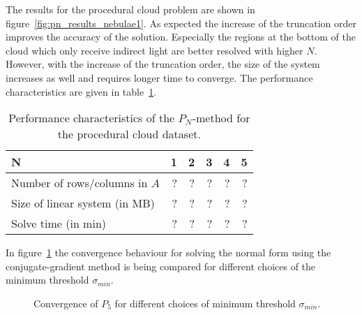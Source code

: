 The results for the procedural cloud problem are shown in figure~\ref{fig:pn_results_nebulae1}. As expected the increase of the truncation order improves the accuracy of the solution. Especially the regions at the bottom of the cloud which only receive indirect light are better resolved with higher $N$. However, with the increase of the truncation order, the size of the system increases as well and requires longer time to converge. The performance characteristics are given in table~\ref{tab:results_cloud}.
\begin{table}[!h]
	\centering
	\caption[table test what is this doing here?]{Performance characteristics of the $P_N$-method for the procedural cloud dataset.}
	\label{tab:results_cloud}
	\begin{tabular}{l r r r r r}
    \hline
	\textbf{N}
    & 1 & 2 & 3 & 4 & 5
    \\
    \hline
    Number of rows/columns in $A$
    & ? & ? & ? & ? & ?
    \\
    Size of linear system (in MB)
    & ? & ? & ? & ? & ?
    \\
    Solve time (in min)
    & ? & ? & ? & ? & ?
	\end{tabular}
\end{table}

In figure~\ref{fig:pn_results_convergence} the convergence behaviour for solving the normal form using the conjugate-gradient method is being compared for different choices of the minimum threshold $\sigma_{min}$.
\begin{figure}[h]
\centering
{}
\caption{Convergence of $P_5$ for different choices of minimum threshold $\sigma_{min}$.}
\label{fig:pn_results_convergence}
\end{figure}




